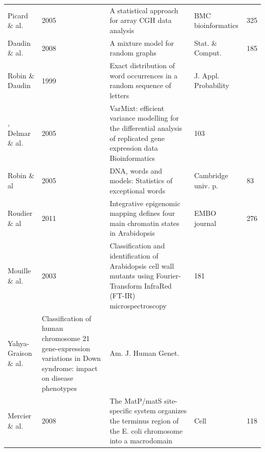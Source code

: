 \begin{tabular}{lllll}
  Picard \& al. & 2005 & A statistical approach for array CGH data analysis & BMC bioinformatics & 325 \\
  Daudin \& al. & 2008 & A mixture model for random graphs & Stat. \& Comput. & 185 \\
  Robin \& Daudin & 1999 & Exact distribution of word occurrences in a random sequence of letters & J. Appl. Probability \\,
  Delmar \& al. & 2005 & VarMixt: efficient variance modelling for the differential analysis of replicated gene expression data Bioinformatics & 103 \\
  Robin \& al & 2005 & DNA, words and models: Statistics of exceptional words & Cambridge univ. p. & 83 \\
  \hline
  Roudier \& al & 2011 & Integrative epigenomic mapping defines four main chromatin states in Arabidopsis & EMBO journal & 276 \\
  Mouille \& al. & 2003 & Classification and identification of Arabidopsis cell wall mutants using Fourier-Transform InfraRed (FT-IR) microspectroscopy & 181 \\
  Yahya-Graison \& al. & Classification of human chromosome 21 gene-expression variations in Down syndrome: impact on disease phenotypes & Am. J. Human Genet. \\
  Mercier \& al. & 2008 & The MatP/matS site-specific system organizes the terminus region of the E. coli chromosome into a macrodomain & Cell & 118
\end{tabular}
